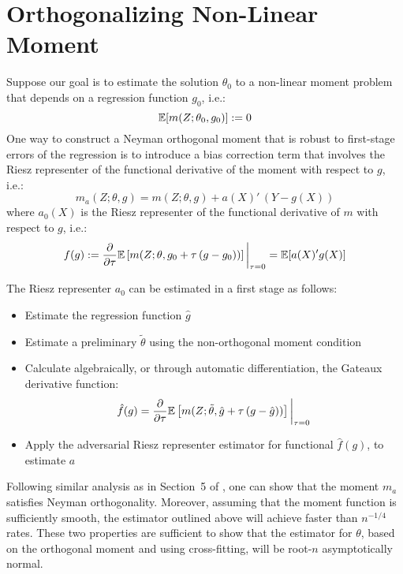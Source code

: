 \section{Orthogonalizing Non-Linear Moment}

Suppose our goal is to estimate the solution $\theta_0$ to a non-linear moment problem that depends on a regression function $g_0$, i.e.:
\begin{equation}
    \mathbb{E}[m(Z; \theta_0, g_0)] := 0
\end{equation}
One way to construct a Neyman orthogonal moment that is robust to first-stage errors of the regression is to introduce a bias correction term that involves the Riesz representer of the functional derivative of the moment with respect to $g$, i.e.:
\begin{equation}
    m_{a}(Z; \theta, g) = m(Z; \theta, g) + a(X)'\, (Y - g(X))
\end{equation}
where $a_0(X)$ is the Riesz representer of the functional derivative of $m$ with respect to $g$, i.e.:
\begin{equation}
    f(g) := \frac{\partial}{\partial \tau} \mathbb{E}\left[m(Z; \theta, g_0 + \tau\, (g - g_{0}))\right] \bigg|_{\tau=0} = \mathbb{E}[a(X)' g(X)]
\end{equation}

The Riesz representer $a_0$ can be estimated in a first stage as follows:
\begin{itemize}
    \item Estimate the regression function $\hat{g}$
    \item Estimate a preliminary $\tilde{\theta}$ using the non-orthogonal moment condition
    \item Calculate algebraically, or through automatic differentiation, the Gateaux derivative function:
    \begin{equation}
        \hat{f}(g) = \frac{\partial}{\partial \tau}\mathbb{E}\left[m(Z; \tilde{\theta}, \hat{g} + \tau\, (g - \hat{g}))\right]\bigg|_{\tau=0}
    \end{equation}
    \item Apply the adversarial Riesz representer estimator for functional $\hat{f}(g)$, to estimate $a$
\end{itemize}

Following similar analysis as in Section~5 of \cite{chernozhukov2018learning}, one can show that the moment $m_{a}$ satisfies Neyman orthogonality. Moreover, assuming that the moment function is sufficiently smooth, the estimator outlined above will achieve faster than $n^{-1/4}$ rates. These two properties are sufficient to show that the estimator for $\theta$, based on the orthogonal moment and using cross-fitting, will be root-$n$ asymptotically normal.


